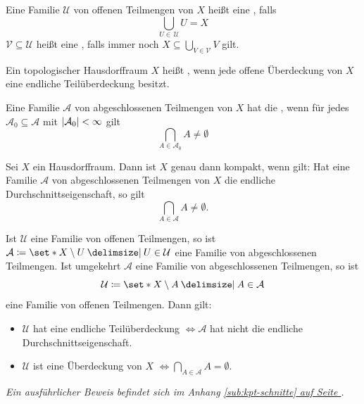 \begin{definition}[{name=[Offene Überdeckung und Teilüberdeckung]}]
	Eine Familie $\mathcal{U}$ von offenen Teilmengen von $X$ heißt eine , falls 
	\[
		\bigcup_{U \in \,\mathcal{U}} U = X
	\] 
	$\mathcal{V} \subseteq \mathcal{U}$ heißt eine , falls immer noch $X \subseteq \bigcup_{V \in \mathcal{V}} V$ gilt.
\end{definition}

\begin{definition}[{name=[Kompaktheit]}]
	Ein topologischer Hausdorffraum $X$ heißt , wenn jede offene Überdeckung von $X$ eine endliche Teilüberdeckung besitzt.
\end{definition}

\begin{definition}[{name=[endliche Durchschnittseigenschaft]}]
	Eine Familie $\mathcal{A}$ von abgeschlossenen Teilmengen von $X$ hat die , wenn für jedes $\mathcal{A}_0 \subseteq \mathcal{A}$ mit
	$\abs*{\mathcal{A}_0 } < \infty$ gilt 
	\[
		\bigcap_{A \in \mathcal{A}_0 } A \neq \emptyset
	\]
\end{definition}

\begin{lemma}[{name=[Äquivalenz zur Kompaktheit eines Hausdorffraumes]},label=lem:kpt-schnitte]
	Sei $X$ ein Hausdorffraum.
	Dann ist $X$ genau dann kompakt, wenn gilt: Hat eine Familie $\mathcal{A}$ von abgeschlossenen Teilmengen von $X$ die endliche 
	Durchschnittseigenschaft, so gilt
	\[
		\bigcap_{A \in \mathcal{A}} A \neq \emptyset.
	\]
\end{lemma}
\begin{beweis}
	Ist $\mathcal{U}$ eine Familie von offenen Teilmengen, so ist $\mathcal{A} \coloneqq \set*{X \setminus U \given U \in \mathcal{U}}$ eine Familie von abgeschlossenen Teilmengen. 
	Ist umgekehrt $\mathcal{A}$ eine Familie von abgeschlossenen Teilmengen, so ist 
	\[
		\mathcal{U} \coloneqq \set*{X \setminus A \given A \in \mathcal{A} } 
	\]
	eine Familie von offenen Teilmengen.
	Dann gilt: 
	\begin{itemize}
		\item $\mathcal{U}$ hat eine endliche Teilüberdeckung $\iff \mathcal{A}$ hat nicht die endliche Durchschnittseigenschaft.
		\item $\mathcal{U}$ ist eine Überdeckung von $X$ $\iff \bigcap_{A \in \mathcal{A}}A = \emptyset$. \qedhere
	\end{itemize}
	\emph{Ein ausführlicher Beweis befindet sich im Anhang \hyperref[sub:kpt-schnitte]{\ref*{sub:kpt-schnitte} auf Seite \pageref*{sub:kpt-schnitte}}.}
\end{beweis}

